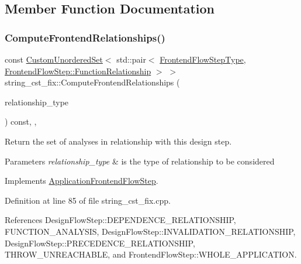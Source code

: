 \subsection{Member Function Documentation}
\mbox{\label{classstring__cst__fix_a5b196cc1483a0239528d31c371d9834e}} 
\subsubsection{\texorpdfstring{Compute\+Frontend\+Relationships()}{ComputeFrontendRelationships()}}
{\footnotesize\ttfamily const \hyperlink{classCustomUnorderedSet}{Custom\+Unordered\+Set}$<$ std\+::pair$<$ \hyperlink{frontend__flow__step_8hpp_afeb3716c693d2b2e4ed3e6d04c3b63bb}{Frontend\+Flow\+Step\+Type}, \hyperlink{classFrontendFlowStep_af7cf30f2023e5b99e637dc2058289ab0}{Frontend\+Flow\+Step\+::\+Function\+Relationship} $>$ $>$ string\+\_\+cst\+\_\+fix\+::\+Compute\+Frontend\+Relationships (\begin{DoxyParamCaption}\item[{const \hyperlink{classDesignFlowStep_a723a3baf19ff2ceb77bc13e099d0b1b7}{Design\+Flow\+Step\+::\+Relationship\+Type}}]{relationship\+\_\+type }\end{DoxyParamCaption}) const\hspace{0.3cm}{\ttfamily [override]}, {\ttfamily [protected]}, {\ttfamily [virtual]}}



Return the set of analyses in relationship with this design step. 


\begin{DoxyParams}{Parameters}
{\em relationship\+\_\+type} & is the type of relationship to be considered \\
\hline
\end{DoxyParams}


Implements \hyperlink{classApplicationFrontendFlowStep_ab308200c0096ccff3a1ff50e864ed61f}{Application\+Frontend\+Flow\+Step}.



Definition at line 85 of file string\+\_\+cst\+\_\+fix.\+cpp.



References Design\+Flow\+Step\+::\+D\+E\+P\+E\+N\+D\+E\+N\+C\+E\+\_\+\+R\+E\+L\+A\+T\+I\+O\+N\+S\+H\+IP, F\+U\+N\+C\+T\+I\+O\+N\+\_\+\+A\+N\+A\+L\+Y\+S\+IS, Design\+Flow\+Step\+::\+I\+N\+V\+A\+L\+I\+D\+A\+T\+I\+O\+N\+\_\+\+R\+E\+L\+A\+T\+I\+O\+N\+S\+H\+IP, Design\+Flow\+Step\+::\+P\+R\+E\+C\+E\+D\+E\+N\+C\+E\+\_\+\+R\+E\+L\+A\+T\+I\+O\+N\+S\+H\+IP, T\+H\+R\+O\+W\+\_\+\+U\+N\+R\+E\+A\+C\+H\+A\+B\+LE, and Frontend\+Flow\+Step\+::\+W\+H\+O\+L\+E\+\_\+\+A\+P\+P\+L\+I\+C\+A\+T\+I\+ON.

